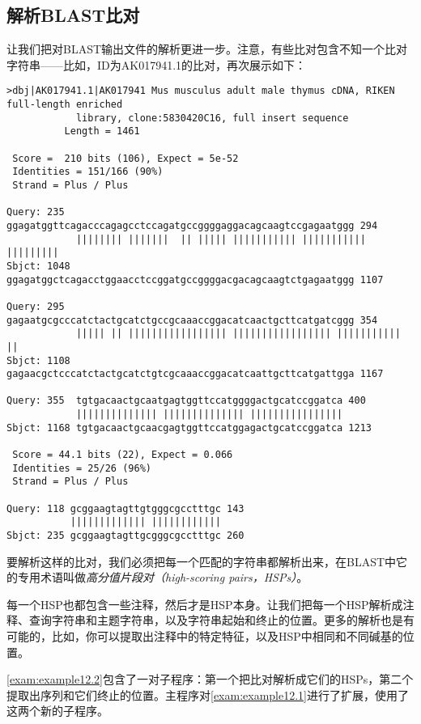 \subsection{解析BLAST比对}
让我们把对BLAST输出文件的解析更进一步。注意，有些比对包含不知一个比对字符串——比如，ID为AK017941.1的比对，再次展示如下：

\begin{lstlisting}
>dbj|AK017941.1|AK017941 Mus musculus adult male thymus cDNA, RIKEN
full-length enriched
            library, clone:5830420C16, full insert sequence
          Length = 1461

 Score =  210 bits (106), Expect = 5e-52
 Identities = 151/166 (90%)
 Strand = Plus / Plus

Query: 235  ggagatggttcagacccagagcctccagatgccggggaggacagcaagtccgagaatggg 294
            |||||||| |||||||  || ||||| ||||||||||| ||||||||||| |||||||||
Sbjct: 1048 ggagatggctcagacctggaacctccggatgccggggacgacagcaagtctgagaatggg 1107

Query: 295  gagaatgcgcccatctactgcatctgccgcaaaccggacatcaactgcttcatgatcggg 354
            ||||| || ||||||||||||||||| ||||||||||||||||| ||||||||||| ||
Sbjct: 1108 gagaacgctcccatctactgcatctgtcgcaaaccggacatcaattgcttcatgattgga 1167

Query: 355  tgtgacaactgcaatgagtggttccatggggactgcatccggatca 400
            |||||||||||||| |||||||||||||| ||||||||||||||||
Sbjct: 1168 tgtgacaactgcaacgagtggttccatggagactgcatccggatca 1213

 Score = 44.1 bits (22), Expect = 0.066
 Identities = 25/26 (96%)
 Strand = Plus / Plus

Query: 118 gcggaagtagttgtgggcgcctttgc 143
           ||||||||||||| ||||||||||||
Sbjct: 235 gcggaagtagttgcgggcgcctttgc 260
\end{lstlisting}

要解析这样的比对，我们必须把每一个匹配的字符串都解析出来，在BLAST中它的专用术语叫做\textit{高分值片段对（high-scoring pairs，HSPs）}。

每一个HSP也都包含一些注释，然后才是HSP本身。让我们把每一个HSP解析成注释、查询字符串和主题字符串，以及字符串起始和终止的位置。更多的解析也是有可能的，比如，你可以提取出注释中的特定特征，以及HSP中相同和不同碱基的位置。

\autoref{exam:example12.2}包含了一对子程序：第一个把比对解析成它们的HSPs，第二个提取出序列和它们终止的位置。主程序对\autoref{exam:example12.1}进行了扩展，使用了这两个新的子程序。



